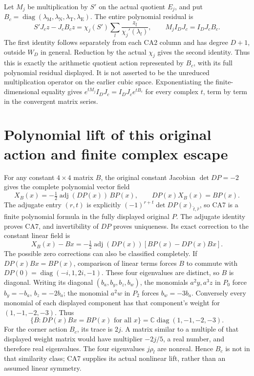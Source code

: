 \documentclass[11pt]{article}
\newcommand{\C}{\mathbb C}
\begin{document}
Let $M_j$ be multiplication by $S'$ on the actual quotient $E_j$,
and put $B_c=\operatorname{diag}(\lambda_\mathrm M,
\lambda_\mathrm N,\lambda_\mathrm T,\lambda_\mathrm E)$.
The entire polynomial residual is
\[
 S'J_cz-J_cB_cz
 =\chi_j(S')\sum_l\frac{z_l}{\chi_j'(\lambda_l)},\qquad
 M_j I_DJ_c=I_DJ_c B_c. \tag{CA6}
\]
The first identity follows separately from each CA2 column and
has degree $D+1$, outside $W_D$ in general. Reduction by the
actual $\chi_j$ gives the second identity. Thus this is exactly
the arithmetic quotient action represented by $B_c$, with its
full polynomial residual displayed. It is not asserted to be the
unreduced multiplication operator on the earlier cubic space.
Exponentiating the finite-dimensional equality gives
$e^{tM_j}I_DJ_c=I_DJ_c e^{tB_c}$ for every complex $t$, term
by term in the convergent matrix series.

\section{Polynomial lift of this original action and finite complex escape}
For any constant $4\times4$ matrix $B$, the original constant
Jacobian $\det DP=-2$ gives the complete polynomial vector field
\[
 X_B(x)=-\tfrac12\operatorname{adj}(DP(x))\,BP(x),\qquad
 DP(x)X_B(x)=BP(x). \tag{CA7}
\]
The adjugate entry $(r,t)$ is explicitly
$(-1)^{r+t}\det DP(x)_{\widehat t,\widehat r}$, so CA7 is a
finite polynomial formula in the fully displayed original $P$.
The adjugate identity proves CA7, and invertibility of $DP$
proves uniqueness. Its exact correction to the constant linear
field is
\[
 X_B(x)-Bx=-\tfrac12\operatorname{adj}(DP(x))
                         [BP(x)-DP(x)Bx]. \tag{CA8}
\]
The possible zero corrections can also be classified completely.
If $DP(x)Bx=BP(x)$, comparison of linear terms forces $B$ to
commute with $DP(0)=\operatorname{diag}(-i,1,2i,-1)$.
These four eigenvalues are distinct, so $B$ is diagonal.
Writing its diagonal $(b_a,b_y,b_z,b_w)$, the monomials
$a^2y,a^3z$ in $P_0$ force $b_y=-b_a$, $b_z=-2b_a$;
the monomial $a^2w$ in $P_2$ forces $b_w=-3b_a$.
Conversely every monomial of each displayed component has
that component's weight for $(1,-1,-2,-3)$. Thus
\[
 \{B:DP(x)Bx=BP(x)\text{ for all }x\}
       =\C\operatorname{diag}(1,-1,-2,-3). \tag{CA9}
\]
For the corner action $B_c$, its trace is $2j$. A matrix
similar to a multiple of that displayed weight matrix would
have multiplier $-2j/5$, a real number, and therefore real
eigenvalues. The four eigenvalues $j\rho_l$ are nonreal.
Hence $B_c$ is not in that similarity class; CA7 supplies its
actual nonlinear lift, rather than an assumed linear symmetry.
\end{document}
